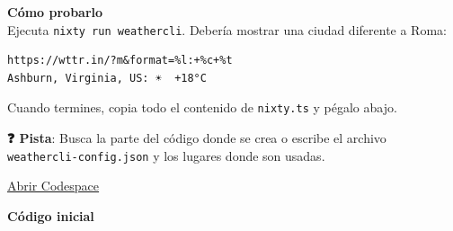 \textbf{Cómo probarlo}\\
Ejecuta \texttt{nixty run weathercli}. Debería mostrar una ciudad diferente a Roma:

\begin{bloquecodigo}
\begin{lstlisting}
https://wttr.in/?m&format=%l:+%c+%t
Ashburn, Virginia, US: ☀️  +18°C
\end{lstlisting}
\end{bloquecodigo}

Cuando termines, copia todo el contenido de \texttt{nixty.ts} y pégalo abajo.

\textbf{❓ Pista}: Busca la parte del código donde se crea o escribe el archivo \texttt{weathercli-\allowbreak{}config.\allowbreak{}json} y los lugares donde son usadas.

\href{https://codespaces.new/DanielRasho/Thesis-codespaces?quickstart=1&devcontainer_path=.devcontainer/nixty/devcontainer.json}{\underline{Abrir Codespace}}

\textbf{Código inicial}

